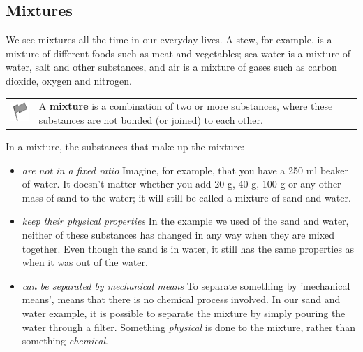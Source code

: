             \subsection{ Mixtures}
            \nopagebreak
            \label{m38708*id62584}We see mixtures all the time in our everyday lives. A stew, for example, is a mixture of different foods such as meat and vegetables; sea water is a mixture of water, salt and other substances, and air is a mixture of gases such as carbon dioxide, oxygen and nitrogen.\par 
\label{m38708*fhsst!!!underscore!!!id69}\begin{definition}
	  \begin{tabular*}{15 cm}{m{15 mm}m{}}
	\hspace*{-50pt}  \includegraphics[width=0.5in]{col11305.imgs/psflag2.png}   & \Definition{   \label{id2405672}\textbf{ Mixture }} { \label{m38708*meaningfhsst!!!underscore!!!id69}
      A \textbf{mixture} is a combination of two or more substances, where these substances are not bonded (or joined) to each other. 
       } 
      \end{tabular*}
      \end{definition}
      \label{m38708*id62612}In a mixture, the substances that make up the mixture:\par 
      \label{m38708*id62615}\begin{itemize}[noitemsep]
            \label{m38708*uid2}\item \textsl{are not in a fixed ratio}
Imagine, for example, that you have a 250 ml beaker of water. It doesn't matter whether you add 20 g, 40 g, 100 g or any other mass of sand to the water; it will still be called a mixture of sand and water.
\label{m38708*uid3}\item \textsl{keep their physical properties}
In the example we used of the sand and water, neither of these substances has changed in any way when they are mixed together. Even though the sand is in water, it still has the same properties as when it was out of the water.
\label{m38708*uid4}\item \textsl{can be separated by mechanical means}
To separate something by 'mechanical means', means that there is no chemical process involved. In our sand and water example, it is possible to separate the mixture by simply pouring the water through a filter. Something \textsl{physical} is done to the mixture, rather than something \textsl{chemical}.
\end{itemize}
